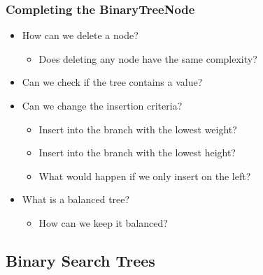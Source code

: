 \documentclass[11pt,handout]{beamer}
\begin{document}
\begin{frame}\frametitle{Completing the BinaryTreeNode}
\begin{itemize}
\item How can we delete a node?
    \begin{itemize}
    \item Does deleting any node have the same complexity?
    \end{itemize}
\item Can we check if the tree contains a value?
\item Can we change the insertion criteria?
    \begin{itemize}
    \item Insert into the branch with the lowest weight?
    \item Insert into the branch with the lowest height?
    \item What would happen if we only insert on the left?
    \end{itemize}
\item What is a balanced tree?
    \begin{itemize}
    \item How can we keep it balanced?
    \end{itemize}
\end{itemize}
\end{frame}

\subsection{Binary Search Trees}
\end{document}
